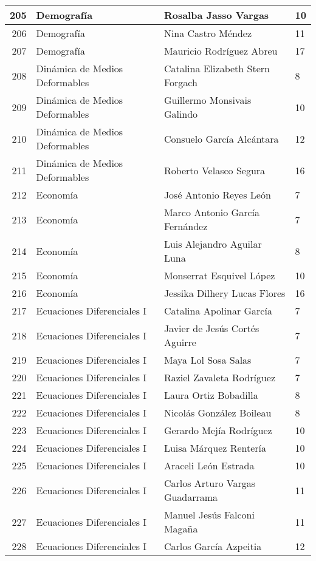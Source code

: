 \begin{table}[ht]
\begin{tabular}{rlll}
  205 & Demografía & Rosalba Jasso Vargas & 10 \\ \hline
  206 & Demografía & Nina Castro Méndez & 11 \\ \hline
  207 & Demografía & Mauricio Rodríguez Abreu & 17 \\ \hline
  208 & Dinámica de Medios Deformables & Catalina Elizabeth Stern Forgach & 8 \\ \hline
  209 & Dinámica de Medios Deformables & Guillermo Monsivais Galindo & 10 \\ \hline
  210 & Dinámica de Medios Deformables & Consuelo García Alcántara & 12 \\ \hline
  211 & Dinámica de Medios Deformables & Roberto Velasco Segura & 16 \\ \hline
  212 & Economía & José Antonio Reyes León & 7 \\ \hline
  213 & Economía & Marco Antonio García Fernández & 7 \\ \hline
  214 & Economía & Luis Alejandro Aguilar Luna & 8 \\ \hline
  215 & Economía & Monserrat Esquivel López & 10 \\ \hline
  216 & Economía & Jessika Dilhery Lucas Flores & 16 \\ \hline
  217 & Ecuaciones Diferenciales I & Catalina Apolinar García & 7 \\ \hline
  218 & Ecuaciones Diferenciales I & Javier de Jesús Cortés Aguirre & 7 \\ \hline
  219 & Ecuaciones Diferenciales I & Maya Lol Sosa Salas & 7 \\ \hline
  220 & Ecuaciones Diferenciales I & Raziel Zavaleta Rodríguez & 7 \\ \hline
  221 & Ecuaciones Diferenciales I & Laura Ortiz Bobadilla & 8 \\ \hline
  222 & Ecuaciones Diferenciales I & Nicolás González Boileau & 8 \\ \hline
  223 & Ecuaciones Diferenciales I & Gerardo Mejía Rodríguez & 10 \\ \hline
  224 & Ecuaciones Diferenciales I & Luisa Márquez Rentería & 10 \\ \hline
  225 & Ecuaciones Diferenciales I & Araceli León Estrada & 10 \\ \hline
  226 & Ecuaciones Diferenciales I & Carlos Arturo Vargas Guadarrama & 11 \\ \hline
  227 & Ecuaciones Diferenciales I & Manuel Jesús Falconi Magaña & 11 \\ \hline
  228 & Ecuaciones Diferenciales I & Carlos García Azpeitia & 12 \\ \hline

\end{tabular}
\end{table}
